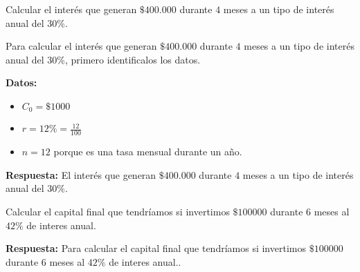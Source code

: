 \documentclass[12pt]{examdesign}
\theoremstyle{plain}
\theoremstyle{definition}
\theoremstyle{remark}
\begin{document}
    \begin{shortanswer}[title={Leemos el material de consulta y realizamos las actividades propuestas.}, rearrange=no]
    	\begin{question}
    		Calcular el interés que generan $\$400.000$ durante $4$ meses a un tipo de interés anual del $30\%$.
    	    \begin{answer}
    	    	Para calcular el interés que generan $\$400.000$ durante $4$ meses a un tipo de interés anual del $30\%$, primero identificalos los datos.
    	    	
    	    	\textbf{Datos:}
    	    	
    	    	\begin{itemize}
    	    		\item $C_{0}=\$1000$
    	    		\item $r=12\%=\displaystyle{\frac{12}{100}}$
    	    		\item $n=12$ porque es una tasa mensual durante un año.
    	    	\end{itemize}
        	
    	    	\textbf{Respuesta:} El interés que generan $\$400.000$ durante $4$ meses a un tipo de interés anual del $30\%$.
    	    \end{answer}
    	\end{question}
        
        \begin{question}
        	Calcular el capital final que tendríamos si invertimos $\$100000$ durante $6$ meses al $42\%$ de interes anual.	
        	\begin{answer}
        		\textbf{Respuesta:} Para calcular el capital final que tendríamos si invertimos $\$100000$ durante $6$ meses al $42\%$ de interes anual..
        			    

\end{answer}
\end{question}
\end{shortanswer}
\end{document}
